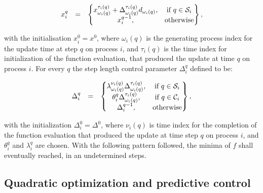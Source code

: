 	\begin{equation}
        \begin{array}{rcl}
            x_i^q&=&\begin{Bmatrix}
                x_{\omega_i(q)}^{\tau_i(q)}+\Delta_{\omega_i(q)}^{\tau_i(q)}d_{\omega_i(q)},&\textnormal{if }q\in\mathcal{S}_i\\
                x_i^{q-1},&\textnormal{otherwise}\\
            \end{Bmatrix},\\
        \end{array}
        \label{BSIC:equ:APPS_x}
    \end{equation}
		
		with the initialisation $x^0_i=x^0$, where $\omega_i(q)$ is the generating process index for the update time at step $q$ on process $i$, and $\tau_i(q)$ is the time index for initialization of the function evaluation, that produced the update at time $q$ on process $i$. For every $q$ the step length control parameter $\Delta_i^q$ defined to be:
		
		\begin{equation}
        \begin{array}{rcl}
            \Delta_i^q&=&\begin{Bmatrix}
                \lambda_{\omega_i(q)}^{\nu_i(q)}\Delta_{\omega_i(q)}^{\tau_i(q)},&\textnormal{if }q\in\mathcal{S}_i\\
								\theta_{i}^{q}\Delta_{\omega_i(q)}^{\tau_i(q)},&\textnormal{if }q\in\mathcal{C}_i\\
                \Delta_i^{q-1},&\textnormal{otherwise}\\
            \end{Bmatrix},\\
        \end{array}
        \label{BSIC:equ:APPS_Delta}
    \end{equation}
		
		with the initialization $\Delta^0_i=\Delta^0$, where $\nu_i(q)$ is  time index for the completion of the function evaluation that produced the update at time step $q$ on process $i$, and $\theta_i^q$ and $\lambda_i^q$ are chosen. With the following pattern followed, the minima of $f$ shall eventually reached, in an undetermined steps.

\subsection{Quadratic optimization and predictive control}\label{BASICCSR:sec:MPC}

